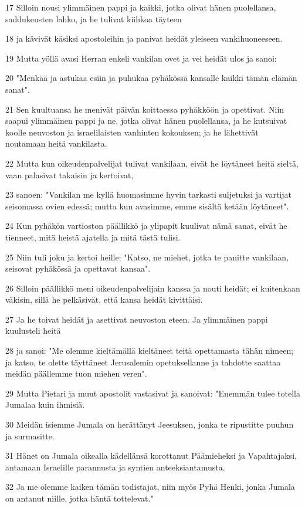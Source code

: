 \par 17 Silloin nousi ylimmäinen pappi ja kaikki, jotka olivat hänen puolellansa, saddukeusten lahko, ja he tulivat kiihkoa täyteen
\par 18 ja kävivät käsiksi apostoleihin ja panivat heidät yleiseen vankihuoneeseen.
\par 19 Mutta yöllä avasi Herran enkeli vankilan ovet ja vei heidät ulos ja sanoi:
\par 20 "Menkää ja astukaa esiin ja puhukaa pyhäkössä kansalle kaikki tämän elämän sanat".
\par 21 Sen kuultuansa he menivät päivän koittaessa pyhäkköön ja opettivat. Niin saapui ylimmäinen pappi ja ne, jotka olivat hänen puolellansa, ja he kutsuivat koolle neuvoston ja israelilaisten vanhinten kokouksen; ja he lähettivät noutamaan heitä vankilasta.
\par 22 Mutta kun oikeudenpalvelijat tulivat vankilaan, eivät he löytäneet heitä sieltä, vaan palasivat takaisin ja kertoivat,
\par 23 sanoen: "Vankilan me kyllä huomasimme hyvin tarkasti suljetuksi ja vartijat seisomassa ovien edessä; mutta kun avasimme, emme sisältä ketään löytäneet".
\par 24 Kun pyhäkön vartioston päällikkö ja ylipapit kuulivat nämä sanat, eivät he tienneet, mitä heistä ajatella ja mitä tästä tulisi.
\par 25 Niin tuli joku ja kertoi heille: "Katso, ne miehet, jotka te panitte vankilaan, seisovat pyhäkössä ja opettavat kansaa".
\par 26 Silloin päällikkö meni oikeudenpalvelijain kanssa ja nouti heidät; ei kuitenkaan väkisin, sillä he pelkäsivät, että kansa heidät kivittäisi.
\par 27 Ja he toivat heidät ja asettivat neuvoston eteen. Ja ylimmäinen pappi kuulusteli heitä
\par 28 ja sanoi: "Me olemme kieltämällä kieltäneet teitä opettamasta tähän nimeen; ja katso, te olette täyttäneet Jerusalemin opetuksellanne ja tahdotte saattaa meidän päällemme tuon miehen veren".
\par 29 Mutta Pietari ja muut apostolit vastasivat ja sanoivat: "Enemmän tulee totella Jumalaa kuin ihmisiä.
\par 30 Meidän isiemme Jumala on herättänyt Jeesuksen, jonka te ripustitte puuhun ja surmasitte.
\par 31 Hänet on Jumala oikealla kädellänsä korottanut Päämieheksi ja Vapahtajaksi, antamaan Israelille parannusta ja syntien anteeksiantamusta.
\par 32 Ja me olemme kaiken tämän todistajat, niin myös Pyhä Henki, jonka Jumala on antanut niille, jotka häntä tottelevat."
